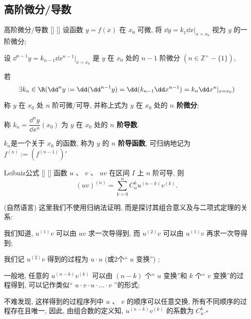 \documentclass[UTF8]{ctexart}
\begin{document}
        \subsection{高阶微分/导数}
			
			\begin{dfn}
			    []
			    {高阶微分/导数}
			    []
			    []
				设函数 \(y=f(x)\) 在 \(x_0\) 可微, 将 \(\dd y=k_1\dd x|_{x=x_0}\) 视为 \(y\) 的一阶微分; 
				
				设 \(\dd^{n-1}y=k_{n-1}\dd x^{n-1}|_{x=x_0}\) 是 \(y\) 在 \(x_0\) 处的 \(n-1\) 阶微分 \((n\in\mathbb{Z}^+-\{1\})\), 
				
				若
				\[\exists k_n\in\R(\dd^ny:=\dd(\dd^{n-1} y)=\dd(k_{n-1}\dd x^{n-1})=k_n\dd x^n|_{x=x_0})\]
				
				称 \(y\) 在 \(x_0\) 处 \(n\) 阶可微/可导, 并称上式为 \(y\) 在 \(x_0\) 处的\textbf{ \(n\) 阶微分}; 
				
				称 \(k_n=\dfrac{\dd^ny}{\dd x^n}(x_0)\) 为 \(y\) 在 \(x_0\) 处的\textbf{ \(n\) 阶导数}. 
				
				\(k_n\)是一个关于 \(x_0\) 的函数, 称为 \(y\) 的\textbf{ \(n\) 阶导函数}, 可归纳地记为\(f^{(n)}:=(f^{(n-1)})'\)
			\end{dfn}

            \begin{thm}
			    []
			    {Leibniz公式}
			    []
			    []
				函数 \(u\) 、 \(v\) 、 \(uv\) 在区间 \(I\) 上 \(n\) 阶可导, 则
				\[(uv)^{(n)} = \sum_{k=0}^{n} C_{n}^{k} u^{(n-k)} v^{(k)}.\]
			\end{thm}
			
			\begin{prf}
				 (自然语言) 这里我们不使用归纳法证明, 而是探讨其组合意义及与二项式定理的关系: 

				我们知道,  \(u^{(1)} v\) 可以由 \(uv\) 求一次导得到, 而 \(u^{(2)} v\) 可以由 \(u^{(1)} v\) 再求一次导得到; 

				我们记 \(u^{(2)} v\) 得到的过程为 \(u \cdot u\)  (或2个“ \(u\) 变换”) ;

				一般地, 任意的 \(u^{(n-k)} v^{(k)}\) 可以由 \((n-k)\) 个“ \(u\) 变换”和 \(k\) 个“ \(v\) 变换”的过程得到, 可以记作类似“ \(u\cdot v \cdot u \cdot \dots \cdot v\) ”的形式; 

				不难发现, 这样得到的过程序列中 \(u\) 、 \(v\) 的顺序可以任意交换, 所有不同顺序的过程存在且唯一, 
				因此, 由组合数的定义知,  \(u^{(n-k)} v^{(k)}\) 的系数为 \(C_{n}^{k}\).\(\square\)
			\end{prf}

			
\end{document}
